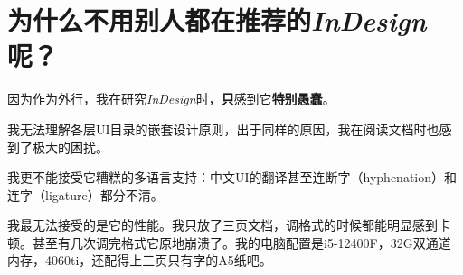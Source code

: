 \documentclass[10pt,openany]{book}
\begin{document}
\begin{sloppypar}
\section{为什么不用别人都在推荐的\textit{InDesign}呢？}

因为作为外行，我在研究\textit{InDesign}时，\textbf{只}感到它\textbf{特别愚蠢}。

我无法理解各层UI目录的嵌套设计原则，出于同样的原因，我在阅读文档时也感到了极大的困扰。

我更不能接受它糟糕的多语言支持：中文UI的翻译甚至连断字（hyphenation）和连字（ligature）都分不清。

我最无法接受的是它的性能。我只放了三页文档，调格式的时候都能明显感到卡顿。甚至有几次调完格式它原地崩溃了。我的电脑配置是i5-12400F，32G双通道内存，4060ti，还配得上三页只有字的A5纸吧。

\thispagestyle{mystyle}

\end{sloppypar}
\end{document}
